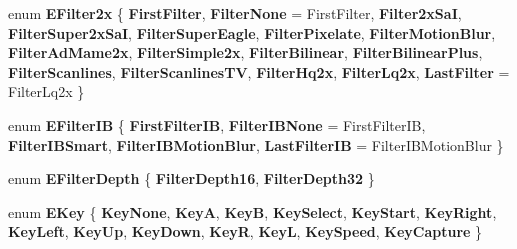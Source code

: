 \begin{DoxyCompactItemize}
\item 
\mbox{\label{class_v_b_a_a1683020d7324daf3bda627d0d3658e3e}} 
enum {\bfseries E\+Filter2x} \{ \newline
{\bfseries First\+Filter}, 
{\bfseries Filter\+None} = First\+Filter, 
{\bfseries Filter2x\+SaI}, 
{\bfseries Filter\+Super2x\+SaI}, 
\newline
{\bfseries Filter\+Super\+Eagle}, 
{\bfseries Filter\+Pixelate}, 
{\bfseries Filter\+Motion\+Blur}, 
{\bfseries Filter\+Ad\+Mame2x}, 
\newline
{\bfseries Filter\+Simple2x}, 
{\bfseries Filter\+Bilinear}, 
{\bfseries Filter\+Bilinear\+Plus}, 
{\bfseries Filter\+Scanlines}, 
\newline
{\bfseries Filter\+Scanlines\+TV}, 
{\bfseries Filter\+Hq2x}, 
{\bfseries Filter\+Lq2x}, 
{\bfseries Last\+Filter} = Filter\+Lq2x
 \}
\item 
\mbox{\label{class_v_b_a_a304ffeb9f4a8b26e7fa4e2eb620d780f}} 
enum {\bfseries E\+Filter\+IB} \{ \newline
{\bfseries First\+Filter\+IB}, 
{\bfseries Filter\+I\+B\+None} = First\+Filter\+IB, 
{\bfseries Filter\+I\+B\+Smart}, 
{\bfseries Filter\+I\+B\+Motion\+Blur}, 
\newline
{\bfseries Last\+Filter\+IB} = Filter\+I\+B\+Motion\+Blur
 \}
\item 
\mbox{\label{class_v_b_a_a6ec41ea038b4ea42eb8d9ea59d3eb4c5}} 
enum {\bfseries E\+Filter\+Depth} \{ {\bfseries Filter\+Depth16}, 
{\bfseries Filter\+Depth32}
 \}
\item 
\mbox{\label{class_v_b_a_a5839ea5408735bd8ce070c4c245750cc}} 
enum {\bfseries E\+Key} \{ \newline
{\bfseries Key\+None}, 
{\bfseries KeyA}, 
{\bfseries KeyB}, 
{\bfseries Key\+Select}, 
\newline
{\bfseries Key\+Start}, 
{\bfseries Key\+Right}, 
{\bfseries Key\+Left}, 
{\bfseries Key\+Up}, 
\newline
{\bfseries Key\+Down}, 
{\bfseries KeyR}, 
{\bfseries KeyL}, 
{\bfseries Key\+Speed}, 
\newline
{\bfseries Key\+Capture}
 \}
\item 
\mbox{\label{class_v_b_a_a20a8479ee93dc52b1fbd911a13cb30a5}} 

\end{DoxyCompactItemize}
